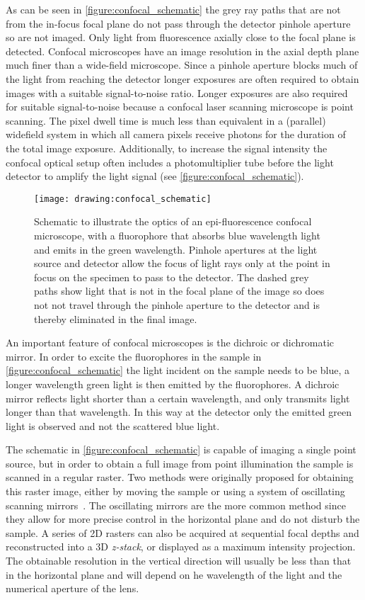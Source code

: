 As can be seen in \autoref{figure:confocal_schematic} the grey ray paths that are not from the in-focus focal plane do not pass through the detector pinhole aperture so are not imaged. Only light from fluorescence axially close to the focal plane is detected. Confocal microscopes have an image resolution in the axial depth plane much finer than a wide-field microscope. Since a pinhole aperture blocks much of the light from reaching the detector longer exposures are often required to obtain images with a suitable signal-to-noise ratio. Longer exposures are also required for suitable signal-to-noise because a confocal laser scanning microscope is point scanning. The pixel dwell time is much less than equivalent in a (parallel) widefield system in which all camera pixels receive photons for the duration of the total image exposure. Additionally, to increase the signal intensity the confocal optical setup often includes a photomultiplier tube before the light detector to amplify the light signal (see \autoref{figure:confocal_schematic}).

\begin{figure}[htbp!]
	\centering
	\texttt{[image: drawing:confocal\_schematic]}
	\caption[Schematic of confocal microscopy optics]{Schematic to illustrate the optics of an epi-fluorescence confocal microscope, with a fluorophore that absorbs blue wavelength light and emits in the green wavelength. Pinhole apertures at the light source and detector allow the focus of light rays only at the point in focus on the specimen to pass to the detector. The dashed grey paths show light that is not in the focal plane of the image so does not not travel through the pinhole aperture to the detector and is thereby eliminated in the final image.}
	\label{figure:confocal_schematic}
\end{figure}

An important feature of confocal microscopes is the dichroic or dichromatic mirror. In order to excite the fluorophores in the sample in \autoref{figure:confocal_schematic} the light incident on the sample needs to be blue, a longer wavelength green light is then emitted by the fluorophores. A dichroic mirror reflects light shorter than a certain wavelength, and only transmits light longer than that wavelength. In this way at the detector only the emitted green light is observed and not the scattered blue light.

The schematic in \autoref{figure:confocal_schematic} is capable of imaging a single point source, but in order to obtain a full image from point illumination the sample is scanned in a regular raster. Two methods were originally proposed for obtaining this raster image, either by moving the sample or using a system of oscillating scanning mirrors~\cite{Minsky1988}. The oscillating mirrors are the more common method since they allow for more precise control in the horizontal plane and do not disturb the sample. A series of 2D rasters can also be acquired at sequential focal depths and reconstructed into a 3D \emph{z-stack}, or displayed as a maximum intensity projection. The obtainable resolution in the vertical direction will usually be less than that in the horizontal plane and will depend on he wavelength of the light and the numerical aperture of the lens.

